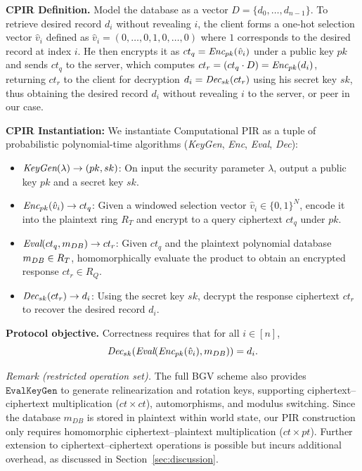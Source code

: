 \documentclass[letterpaper,journal]{IEEEtran}
\begin{document}
\textbf{CPIR Definition.}
Model the database as a vector $D=\{d_0,\dots,d_{n-1}\}$. To retrieve desired record $d_i$ without revealing $i$, 
the client forms a one-hot selection vector $\hat{v}_i$ defined as $\hat{v}_i= (0,\dots,0,1,0,\dots,0)$ where $1$ 
corresponds to the desired record at index $i$. 
He then encrypts it as $ct_q = \emph{Enc}_{pk}(\hat{v}_i)$ under a public key $pk$ and sends $ct_q$ to the server, which computes 
$ct_r = (ct_q \cdot D) = \emph{Enc}_{pk}(d_i)$, returning $ct_r$ to the client for decryption $d_i = \emph{Dec}_{sk}(ct_r)$ 
using his secret key $sk$, thus obtaining the desired record $d_i$ without revealing $i$ to the server, or peer in our case.

\textbf{CPIR Instantiation:}
We instantiate Computational PIR as a tuple of probabilistic polynomial-time algorithms (\emph{KeyGen}, 
\emph{Enc}, \emph{Eval}, \emph{Dec}):
\begin{itemize}
    \item $\emph{KeyGen}(\lambda) \rightarrow (pk, sk)$: On input the security parameter $\lambda$, output a public key $pk$ and a secret key $sk$.
    \item $\emph{Enc}_{pk}(\hat{v}_i) \rightarrow ct_q$: Given a windowed selection vector $\hat{v}_i \in \{0,1\}^N$, 
    encode it into the plaintext ring $R_T$ and encrypt to a query ciphertext $ct_q$ under $pk$.
    \item $\emph{Eval}(ct_q, \emph{$m_{DB}$}) \rightarrow ct_r$: Given $ct_q$ and the plaintext polynomial database $\emph{$m_{DB}$} \in R_T$, 
    homomorphically evaluate the product to obtain an encrypted response $ct_r \in R_Q$.
    \item $\emph{Dec}_{sk}(ct_r) \rightarrow d_i$: Using the secret key $sk$, decrypt the response ciphertext $ct_r$ to recover the desired record $d_i$.
\end{itemize}

\noindent \textbf{Protocol objective.} 
Correctness requires that for all $i \in [n]$,
\[
\emph{Dec}_{sk}\!\left(\emph{Eval}\!\left(\emph{Enc}_{pk}(\hat{v}_i), \emph{$m_{DB}$}\right)\right) = d_i.
\]

\noindent \textit{Remark (restricted operation set).} 
The full BGV scheme also provides $\texttt{EvalKeyGen}$ to generate relinearization and rotation keys,
supporting ciphertext–ciphertext multiplication ($ct \times ct$), automorphisms, and modulus switching.
Since the database \emph{$m_{DB}$} is stored in plaintext within world state,
our PIR construction only requires homomorphic ciphertext–plaintext multiplication ($ct \times pt$).
Further extension to ciphertext–ciphertext operations is possible but incurs additional overhead, as discussed in Section~\ref{sec:discussion}.
\end{document}
